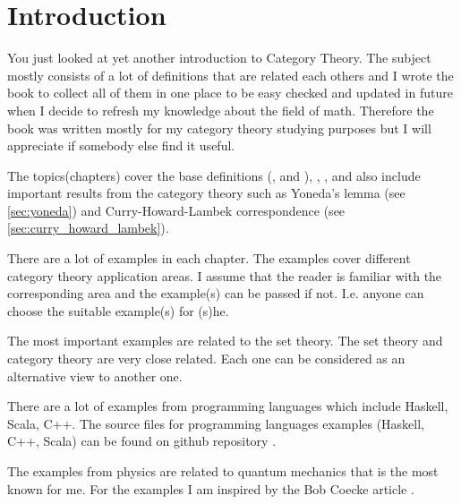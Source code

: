 \chapter*{Introduction}

You just looked at yet another introduction to Category Theory. The
subject mostly consists of a lot of definitions that are related each
others and I wrote the book to collect all of them in one
place to be easy checked and updated in future when I decide to refresh
my knowledge about the field of math. Therefore the book was written mostly
for my category theory studying 
purposes but I will appreciate if somebody else find it useful.

The topics(chapters) cover the base definitions
(,  and
), ,
,  and also include important
results from the category theory such as Yoneda's lemma (see
\cref{sec:yoneda}) and Curry-Howard-Lambek correspondence (see
\cref{sec:curry_howard_lambek}).  

There are a lot of 
examples in each chapter. The examples cover different category
theory application areas. I assume that the reader is familiar with
the corresponding area and the example(s) can be passed if not. I.e.
anyone can choose the suitable example(s) for (s)he. 

The most important examples are related to the set theory. The set
theory and category theory are very close related. Each one can be
considered as an alternative view to another one.

There are a lot of examples from programming languages which include
Haskell, Scala, C++. The source files for programming languages 
examples (Haskell, C++, Scala) can be found on github repository
\cite{bib:github:ivanmurashko}.  

The examples from physics are related to quantum mechanics that is the
most known for me. For the examples I am inspired by the Bob Coecke
article \cite{bib:arxiv:Bob_Coecke_2008}.




